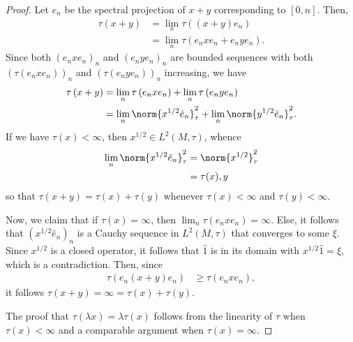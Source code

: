 \documentclass[10pt]{mypackage}
\begin{document}
\begin{proof}
  Let $e_n$ be the spectral projection of $x + y$ corresponding to $\left[ 0,n \right]$. Then,
  \begin{align*}
    \tau\left( x + y \right) &= \lim_{n} \tau\left( \left( x+y \right)e_n \right)\\
                             &= \lim_{n} \tau\left( e_nxe_n + e_nye_n \right).
  \end{align*}
  Since both $\left( e_nxe_n \right)_n$ and $\left( e_nye_n \right)_n$ are bounded sequences with both $\left( \tau\left( e_nxe_n \right) \right)_n$ and $\left( \tau\left( e_nye_n \right) \right)_{n}$ increasing, we have
  \begin{align*}
    \tau\left( x + y \right) &= \lim_{n}\tau\left( e_nxe_n \right) + \lim_{n}\tau\left( e_nye_n \right)\\
                             &= \lim_{n} \norm{x^{1/2}\hat{e}_n}_{\tau}^2 + \lim_{n}\norm{y^{1/2}\hat{e}_n}_{\tau}^{2}.
  \end{align*}
  If we have $\tau(x) < \infty$, then $x^{1/2}\in L^2\left( M,\tau \right)$, whence
  \begin{align*}
    \lim_{n} \norm{x^{1/2}\hat{e}_n}_{\tau}^2 &= \norm{x^{1/2}}_{\tau}^2\\
                                              &= \tau(x),y
  \end{align*}
  so that $\tau\left( x + y \right) = \tau\left( x \right) + \tau\left( y \right)$ whenever $\tau\left( x \right) < \infty$ and $\tau\left( y \right) < \infty$.

  Now, we claim that if $\tau\left( x \right) = \infty$, then $\lim_{n}\tau\left( e_nxe_n \right) = \infty$. Else, it follows that $\left( x^{1/2}\hat{e}_n \right)_{n}$ is a Cauchy sequence in $L^2\left( M,\tau \right)$ that converges to some $\xi$. Since $x^{1/2}$ is a closed operator, it follows that $\hat{1}$ is in its domain with $x^{1/2}\hat{1} = \xi$, which is a contradiction. Then, since
  \begin{align*}
    \tau\left( e_n\left( x + y \right)e_n \right) &\geq \tau\left( e_nxe_n \right),
  \end{align*}
  it follows $\tau\left( x + y \right) = \infty = \tau\left( x \right) + \tau\left( y \right)$.

  The proof that $\tau\left( \lambda x \right) = \lambda \tau(x)$ follows from the linearity of $\tau$ when $\tau(x) < \infty$ and a comparable argument when $\tau(x) = \infty$.


\end{proof}
\end{document}
